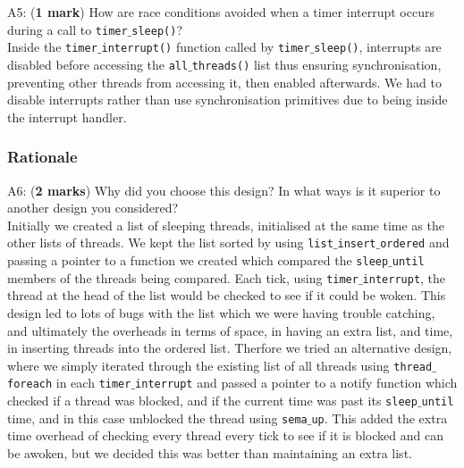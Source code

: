\documentclass[a4paper,12pt]{article}
\begin{document}
\noindent
A5: ({\bf 1 mark}) How are race conditions avoided when a timer interrupt occurs during a call to \texttt{timer$\_$sleep()}? \\

Inside the \texttt{timer$\_$interrupt()} function called by \texttt{timer$\_$sleep()}, interrupts are disabled before accessing the \texttt{all$\_$threads()} list thus ensuring synchronisation, preventing other threads from accessing it, then enabled afterwards. We had to disable interrupts rather than use synchronisation primitives due to being inside the interrupt handler. \\

\subsubsection*{Rationale}
A6: ({\bf 2 marks}) Why did you choose this design?
In what ways is it superior to another design you considered? \\

Initially we created a list of sleeping threads, initialised at the same time as the other lists of threads. We kept the list sorted by using \texttt{list$\_$insert$\_$ordered} and passing a pointer to a function we created which compared the \texttt{sleep$\_$until} members of the threads being compared. Each tick, using \texttt{timer$\_$interrupt}, the thread at the head of the list would be checked to see if it could be woken. This design led to lots of bugs with the list which we were having trouble catching, and ultimately the overheads in terms of space, in having an extra list, and time, in inserting threads into the ordered list. Therfore we tried an alternative design, where we simply iterated through the existing list of all threads using \texttt{thread$\_$foreach} in each \texttt{timer$\_$interrupt} and passed a pointer to a notify function which checked if a thread was blocked, and if the current time was past its \texttt{sleep$\_$until} time, and in this case unblocked the thread using \texttt{sema$\_$up}. This added the extra time overhead of checking every thread every tick to see if it is blocked and can be awoken, but we decided this was better than maintaining an extra list.
\end{document}
